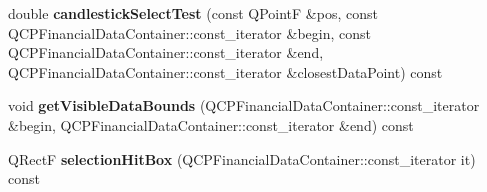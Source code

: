 \begin{DoxyCompactItemize}
\item 
double {\bfseries candlestick\+Select\+Test} (const Q\+PointF \&pos, const Q\+C\+P\+Financial\+Data\+Container\+::const\+\_\+iterator \&begin, const Q\+C\+P\+Financial\+Data\+Container\+::const\+\_\+iterator \&end, Q\+C\+P\+Financial\+Data\+Container\+::const\+\_\+iterator \&closest\+Data\+Point) const \hypertarget{classQCPFinancial_a34bf41e29ade0ea6840536279c10b58c}{}\label{classQCPFinancial_a34bf41e29ade0ea6840536279c10b58c}

\item 
void {\bfseries get\+Visible\+Data\+Bounds} (Q\+C\+P\+Financial\+Data\+Container\+::const\+\_\+iterator \&begin, Q\+C\+P\+Financial\+Data\+Container\+::const\+\_\+iterator \&end) const \hypertarget{classQCPFinancial_ad650d7fd0f498f6ca65460a031c37515}{}\label{classQCPFinancial_ad650d7fd0f498f6ca65460a031c37515}

\item 
Q\+RectF {\bfseries selection\+Hit\+Box} (Q\+C\+P\+Financial\+Data\+Container\+::const\+\_\+iterator it) const \hypertarget{classQCPFinancial_ae31f1142fadc67b2721698ec3153b7d5}{}\label{classQCPFinancial_ae31f1142fadc67b2721698ec3153b7d5}

\end{DoxyCompactItemize}

